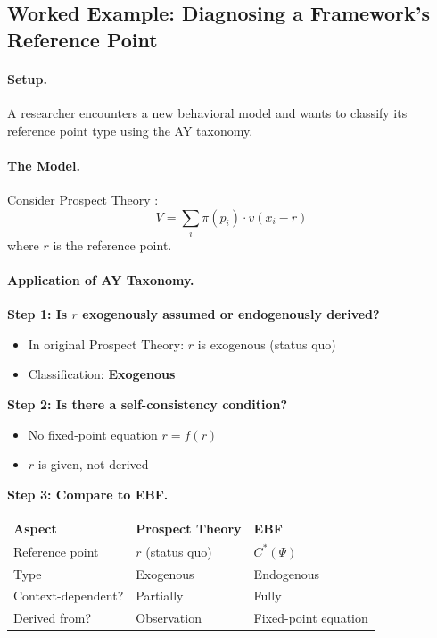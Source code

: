

\subsection{Worked Example: Diagnosing a Framework's Reference Point}
\label{sec:AY-example}

\paragraph{Setup.}
A researcher encounters a new behavioral model and wants to classify its
reference point type using the AY taxonomy.

\paragraph{The Model.}
Consider Prospect Theory \citep{kahnemantversky1979}:
\begin{equation}
V = \sum_i \pi(p_i) \cdot v(x_i - r)
\end{equation}
where $r$ is the reference point.

\paragraph{Application of AY Taxonomy.}

\textbf{Step 1: Is $r$ exogenously assumed or endogenously derived?}
\begin{itemize}[nosep]
    \item In original Prospect Theory: $r$ is exogenous (status quo)
    \item Classification: \textbf{Exogenous}
\end{itemize}

\textbf{Step 2: Is there a self-consistency condition?}
\begin{itemize}[nosep]
    \item No fixed-point equation $r = f(r)$
    \item $r$ is given, not derived
\end{itemize}

\textbf{Step 3: Compare to EBF.}
\begin{center}
\begin{tabular}{lll}
\toprule
\textbf{Aspect} & \textbf{Prospect Theory} & \textbf{EBF} \\
\midrule
Reference point & $r$ (status quo) & $C^*(\Psi)$ \\
Type & Exogenous & Endogenous \\
Context-dependent? & Partially & Fully \\
Derived from? & Observation & Fixed-point equation \\
\bottomrule
\end{tabular}
\end{center}

